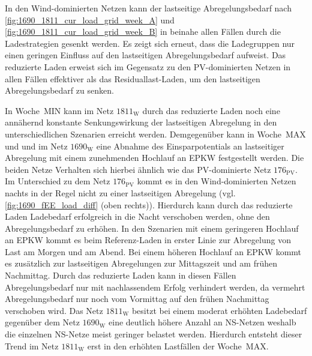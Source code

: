 



In den Wind-dominierten Netzen kann der lastseitige Abregelungsbedarf nach \autoref{fig:1690_1811_cur_load_grid_week_A} und \autoref{fig:1690_1811_cur_load_grid_week_B} in beinahe allen Fällen durch die Ladestrategien gesenkt werden.
Es zeigt sich erneut, dass die Ladegruppen nur einen geringen Einfluss auf den lastseitigen Abregelungsbedarf aufweist.
Das reduzierte Laden erweist sich im Gegensatz zu den \gls{PV}-dominierten Netzen in allen Fällen effektiver als das Residuallast-Laden, um den lastseitigen Abregelungsbedarf zu senken.\medskip



In Woche~MIN kann im Netz \(1811_{\text{W}}\) durch das reduzierte Laden noch eine annähernd konstante Senkungswirkung der lastseitigen Abregelung in den unterschiedlichen Szenarien erreicht werden.
Demgegenüber kann in Woche~MAX und und im Netz \(1690_{\text{W}}\) eine Abnahme des Einsparpotentials an lastseitiger Abregelung mit einem zunehmenden Hochlauf an \gls{EPKW} festgestellt werden.
Die beiden Netze Verhalten sich hierbei ähnlich wie das \gls{PV}-dominierte Netz \(176_{\text{PV}}\).
Im Unterschied zu dem Netz \(176_{\text{PV}}\) kommt es in den Wind-dominierten Netzen nachts in der Regel nicht zu einer lastseitigen Abregelung (vgl. \autoref{fig:1690_fEE_load_diff} (oben rechts)).
Hierdurch kann durch das reduzierte Laden Ladebedarf erfolgreich in die Nacht verschoben werden, ohne den Abregelungsbedarf zu erhöhen.
In den Szenarien mit einem geringeren Hochlauf an \gls{EPKW} kommt es beim Referenz-Laden in erster Linie zur Abregelung von Last am Morgen und am Abend.
Bei einem höheren Hochlauf an \gls{EPKW} kommt es zusätzlich zur lastseitigen Abregelungen zur Mittagszeit und am frühen Nachmittag.
Durch das reduzierte Laden kann in diesen Fällen Abregelungsbedarf nur mit nachlassendem Erfolg verhindert werden, da vermehrt Abregelungsbedarf nur noch vom Vormittag auf den frühen Nachmittag verschoben wird.
Das Netz \(1811_{\text{W}}\) besitzt bei einem moderat erhöhten Ladebedarf gegenüber dem Netz \(1690_{\text{W}}\) eine deutlich höhere Anzahl an \gls{NS}-Netzen weshalb die einzelnen \gls{NS}-Netze meist geringer belastet werden.
Hierdurch entsteht dieser Trend im Netz \(1811_{\text{W}}\) erst in den erhöhten Lastfällen der Woche~MAX.

